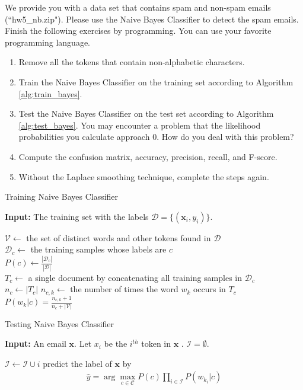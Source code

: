 \documentclass[11pt,letter,notitlepage]{article}
\begin{document}
\clearpage
\begin{exercise}
We provide you with a data set that contains spam and non-spam emails (``hw5\_nb.zip"). Please use the Naive Bayes Classifier to detect the spam emails.
Finish the following exercises by programming. You can use your favorite programming language.
\begin{enumerate}
\item Remove all the tokens that contain non-alphabetic characters.
\item Train the Naive Bayes Classifier on the training set according to Algorithm \ref{alg:train_bayes}.
\item Test the Naive Bayes Classifier on the test set according to Algorithm \ref{alg:test_bayes}. You may encounter a problem that the likelihood probabilities you calculate approach $0$. How do you deal with this problem?
\item Compute the confusion matrix, accuracy, precision, recall, and F-score.
\item Without the Laplace smoothing technique, complete the steps again.
\end{enumerate}
\end{exercise}
\begin{algorithm}
\caption{Training Naive Bayes Classifier}
\label{alg:train_bayes}
\textbf{Input:} The training set with the labels $\mathcal{D}=\{(\mathbf{x}_i,y_i)\}.$
\begin{algorithmic}[1]
\STATE $\mathcal{V}\leftarrow$ the set of distinct words and other tokens found in $\mathcal{D}$\\
\STATE $\mathcal{D}_c\leftarrow$ the training samples whose labels are $c$\\
\STATE $P(c)\leftarrow\frac{|\mathcal{D}_c|}{|\mathcal{D}|}$\\
\STATE $T_c\leftarrow$ a single document by concatenating all training samples in $\mathcal{D}_c$\\
\STATE $n_c\leftarrow |T_c|$
\STATE $n_{c,k}\leftarrow$ the number of times the word $w_k$ occurs in $T_c$\\
\STATE $P(w_k|c)=\frac{n_{c,k}+1}{n_c+|\mathcal{V}|}$
\ENDFOR
\ENDFOR
\end{algorithmic}
\end{algorithm}
\begin{algorithm}
\caption{Testing Naive Bayes Classifier }
\label{alg:test_bayes}
\textbf{Input:} An email $\mathbf{x}$. Let $x_i$ be the $i^{th}$ token in $\mathbf{x}$ . $\mathcal{I}=\emptyset.$
\begin{algorithmic}[1]
\STATE $\mathcal{I}\leftarrow\mathcal{I}\cup i$
\ENDIF
\ENDFOR
\STATE predict the label of $\mathbf{x}$ by
\begin{align*}
    \hat{y}=\arg\max_{c\in\mathcal{C}} P(c)\prod_{i\in\mathcal{I}}P(w_{k_i}|c)
\end{align*}
\end{algorithmic}
\end{algorithm}
\end{document}
